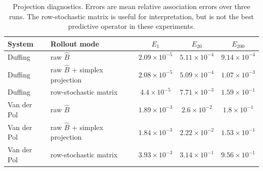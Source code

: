 \begin{table}[t]
\centering
\small
\caption{Projection diagnostics. Errors are mean relative association errors over three runs. The row-stochastic matrix is useful for interpretation, but is not the best predictive operator in these experiments.}
\label{tab:projection}
\begin{tabular}{llccc}
\toprule
System & Rollout mode & $E_1$ & $E_{20}$ & $E_{200}$ \\
\midrule
Duffing & raw $\widehat{B}$ & $2.09\times10^{-5}$ & $5.11\times10^{-4}$ & $9.14\times10^{-4}$ \\
Duffing & raw $\widehat{B}$ + simplex projection & $2.08\times10^{-5}$ & $5.09\times10^{-4}$ & $1.07\times10^{-3}$ \\
Duffing & row-stochastic matrix & $4.4\times10^{-5}$ & $7.71\times10^{-3}$ & $1.59\times10^{-1}$ \\
\midrule
Van der Pol & raw $\widehat{B}$ & $1.89\times10^{-3}$ & $2.6\times10^{-2}$ & $1.8\times10^{-1}$ \\
Van der Pol & raw $\widehat{B}$ + simplex projection & $1.84\times10^{-3}$ & $2.22\times10^{-2}$ & $1.53\times10^{-1}$ \\
Van der Pol & row-stochastic matrix & $3.93\times10^{-3}$ & $3.14\times10^{-1}$ & $9.56\times10^{-1}$ \\
\bottomrule
\end{tabular}
\end{table}
